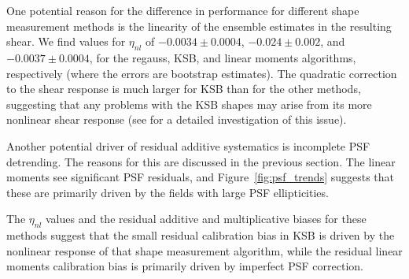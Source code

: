 \documentclass[iop]{emulateapj}
\newcommand\rmcomment[1]{\textcolor{red}{(RM: #1)}}
\begin{document}
One potential reason for the difference in performance for different
shape measurement methods is the linearity of the ensemble estimates
in the resulting shear. We find values for $\eta_{nl}$ of
$-0.0034\pm0.0004$, $-0.024\pm0.002$, and $-0.0037\pm0.0004$, for the
regauss, KSB, and linear moments algorithms, respectively (where the
errors are bootstrap estimates). The quadratic correction to the shear
response is much larger for KSB than for the other methods, suggesting
that any problems with the KSB shapes may arise from its more
nonlinear shear response (see \citealt{2011MNRAS.410.2156V} for a
detailed investigation of this issue).



Another potential driver of residual additive systematics is
incomplete PSF detrending. The reasons for this are discussed in the
previous section. The linear moments see significant PSF residuals,
and Figure~\ref{fig:psf_trends} suggests that these are primarily
driven by the fields with large PSF ellipticities.

The $\eta_{nl}$ values and the residual additive and multiplicative
biases for these methods suggest that the small residual calibration
bias in KSB is driven by the nonlinear response of that shape
measurement algorithm, while the residual linear moments calibration
bias is primarily driven by imperfect PSF correction.
\end{document}

